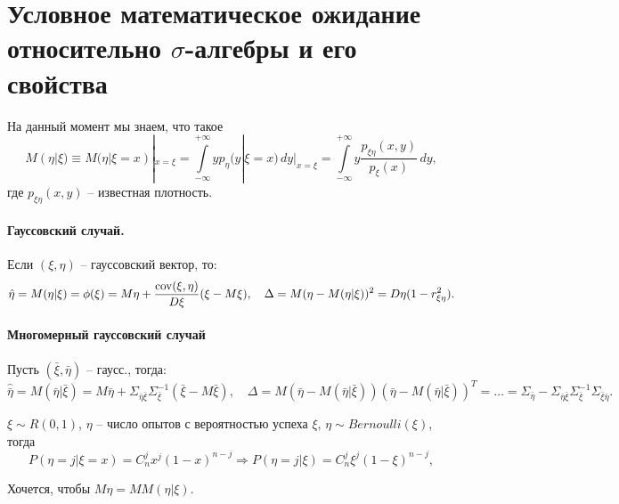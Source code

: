 \section{Условное математическое ожидание относительно $\sigma$-алгебры и его свойства}

На данный момент мы знаем, что такое
\[
  M(\eta | \xi) \equiv M(\eta | \xi = x) |_{x = \xi}
  = \int\limits_{-\infty}^{+\infty} y p_{\eta} (y | \xi = x) \, dy |_{x = \xi}
  = \int\limits_{-\infty}^{+\infty} y \dfrac{p_{\xi\eta} (x, y)}{p_\xi (x)} \, dy,
\]
где $p_{\xi\eta} (x, y)$ -- известная плотность.

\paragraph{Гауссовский случай.}
Если $(\xi, \eta)$ -- гауссовский вектор, то:
\[
  \hat{\eta} = M(\eta | \xi) = \phi(\xi) = M\eta + \dfrac{\operatorname{cov}(\xi, \eta)}{D\xi} (\xi-M\xi), \quad
    \Delta = M(\eta - M(\eta|\xi))^2 = D\eta (1 - r_{\xi\eta}^2).
\]

\paragraph{Многомерный гауссовский случай}
Пусть $(\bar{\xi}, \bar{\eta})$ -- гаусс., тогда:
\[
  \hat{\bar{\eta}} = M(\bar{\eta} | \bar{\xi}) = M\bar{\eta} + \Sigma_{\bar{\eta} \bar{\xi}} \Sigma_{\bar{\xi}}^{-1} (\bar{\xi} - M\bar{\xi}), \quad
  \Delta = M(\bar{\eta} - M(\bar{\eta} | \bar{\xi}))(\bar{\eta} - M(\bar{\eta} | \bar{\xi}))^T
  = \dots = \Sigma_{\bar{\eta}} - \Sigma_{\bar{\eta}\bar{\xi}} \Sigma_{\bar{\xi}}^{-1} \Sigma_{\bar{\xi} \bar{\eta}}.
\]

\begin{ex}\label{ex-bernoulli-with-random-parameter}
  $\xi \sim R(0, 1)$, $\eta$ -- число опытов с вероятностью успеха $\xi$, $\eta \sim Bernoulli(\xi)$,
  тогда 
  \[
    P(\eta = j | \xi = x) = C_n^j x^j (1-x)^{n-j}
    \Rightarrow
    P(\eta = j | \xi) = C_n^j \xi^j (1-\xi)^{n-j},
  \]

  Хочется, чтобы $M\eta = MM(\eta | \xi)$.
\end{ex}


